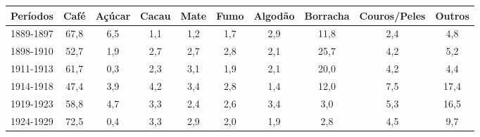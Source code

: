 \begin{table}[!htp]
{
\begin{minipage}{21cm}
\begin{tabular}{|cccccccccc|}
\hline
Períodos & Café & Açúcar & Cacau & Mate & Fumo & Algodão & Borracha & Couros/Peles & Outros \\
\hline
1889-1897 & 67,8 & 6,5 & 1,1 & 1,2 & 1,7 & 2,9 & 11,8 & 2,4 & 4,8 \\
1898-1910 & 52,7 & 1,9 & 2,7 & 2,7 & 2,8 & 2,1 & 25,7 & 4,2 & 5,2 \\
1911-1913 & 61,7 & 0,3 & 2,3 & 3,1 & 1,9 & 2,1 & 20,0 & 4,2 & 4,4 \\
1914-1918 & 47,4 & 3,9 & 4,2 & 3,4 & 2,8 & 1,4 & 12,0 & 7,5 & 17,4 \\
1919-1923 & 58,8 & 4,7 & 3,3 & 2,4 & 2,6 & 3,4 & 3,0 & 5,3 & 16,5 \\
1924-1929 & 72,5 & 0,4 & 3,3 & 2,9 & 2,0 & 1,9 & 2,8 & 4,5 & 9,7 \\
\hline
\end{tabular} 
\end{minipage}
}
{  }
\end{table}